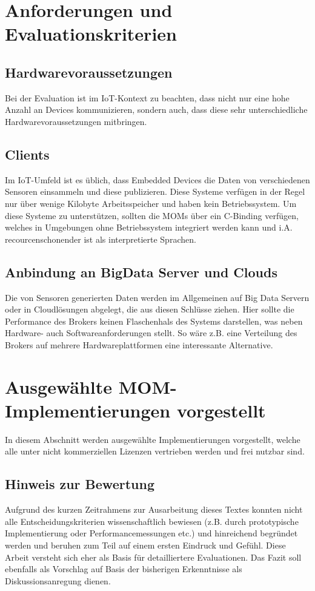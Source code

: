 \documentclass[conference, ngerman]{IEEEtran}
\begin{document}
\section{Anforderungen und Evaluationskriterien}

\subsection{Hardwarevoraussetzungen}
Bei der Evaluation ist im IoT-Kontext zu beachten, dass nicht nur eine hohe Anzahl an Devices kommunizieren, sondern auch, dass diese sehr unterschiedliche Hardwarevoraussetzungen  mitbringen. 
\subsection{Clients}
Im IoT-Umfeld ist es üblich, dass Embedded Devices die Daten von verschiedenen Sensoren einsammeln und diese publizieren. Diese Systeme verfügen in der Regel nur über wenige Kilobyte Arbeitsspeicher und haben kein Betriebssystem. Um diese Systeme zu unterstützen, sollten die MOMs über ein C-Binding verfügen, welches in Umgebungen ohne Betriebssystem integriert werden kann und i.A. recourcenschonender ist als interpretierte Sprachen.

\subsection{Anbindung an BigData Server und Clouds}
Die von Sensoren generierten Daten werden im Allgemeinen auf Big Data Servern oder in Cloudlösungen abgelegt, die aus diesen Schlüsse ziehen. Hier sollte die Performance des Brokers keinen Flaschenhals des Systems darstellen, was neben Hardware- auch Softwareanforderungen stellt. So wäre z.B. eine Verteilung des Brokers auf mehrere Hardwareplattformen eine interessante Alternative. 

\section{Ausgewählte MOM-Implementierungen vorgestellt}
In diesem Abschnitt werden ausgewählte Implementierungen vorgestellt, welche alle unter nicht kommerziellen Lizenzen vertrieben werden und frei nutzbar sind. 
\subsection{Hinweis zur Bewertung}
Aufgrund des kurzen Zeitrahmens zur Ausarbeitung dieses Textes konnten nicht alle Entscheidungskriterien wissenschaftlich bewiesen (z.B. durch prototypische Implementierung oder Performancemessungen etc.) und hinreichend begründet werden und beruhen zum Teil auf einem ersten Eindruck und Gefühl. Diese Arbeit versteht sich eher als Basis für detailliertere Evaluationen. Das Fazit soll ebenfalls als  Vorschlag auf Basis der bisherigen Erkenntnisse als Diskussionsanregung dienen. 
\end{document}
